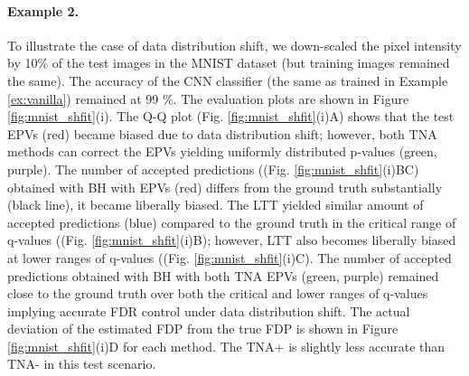 \documentclass{article}
\begin{document}
\paragraph{Example 2.} To illustrate the case of data distribution shift, we down-scaled the pixel intensity by 10\% of the test images in the MNIST dataset (but training images remained the same). The accuracy of the CNN classifier (the same as trained in Example \ref{ex:vanilla}) remained at 99 \%. The evaluation plots are shown in Figure \ref{fig:mnist_shfit}(i). The Q-Q plot (Fig. \ref{fig:mnist_shfit}(i)A) shows that the test EPVs (red) became biased due to data distribution shift; however, both TNA methods can correct the EPVs yielding uniformly distributed p-values (green, purple). The number of accepted predictions ((Fig. \ref{fig:mnist_shfit}(i)BC) obtained with BH with EPVs (red) differs from the ground truth substantially (black line), it became liberally biased. The LTT yielded similar amount of accepted predictions (blue) compared to the ground truth in the critical range of q-values ((Fig. \ref{fig:mnist_shfit}(i)B); however, LTT also becomes liberally biased at lower ranges of q-values ((Fig. \ref{fig:mnist_shfit}(i)C). The number of accepted predictions obtained with BH with both TNA EPVs (green, purple) remained close to the ground truth over both the critical and lower ranges of q-values implying accurate FDR control under data distribution shift. The actual deviation of the estimated FDP from the true FDP is shown in Figure \ref{fig:mnist_shfit}(i)D for each method. The TNA+ is slightly less accurate than TNA- in this test scenario.
\end{document}
